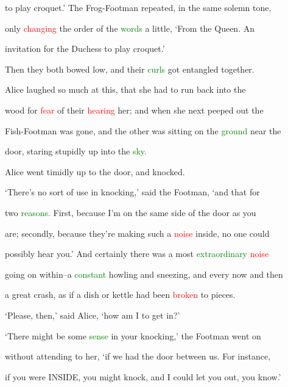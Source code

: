  to play croquet.’ The Frog-Footman repeated, in the same solemn tone,

 only \textcolor{red}{changing} the order of the \textcolor{green}{words} a little, ‘From the Queen. An

 \textcolor{BurntOrange}{invitation} for the Duchess to play croquet.’



 Then they both bowed low, and their \textcolor{green}{curls} got entangled together.



 Alice \textcolor{BurntOrange}{laughed} so much at this, that she had to run back into the

 wood for \textcolor{red}{fear} of their \textcolor{red}{hearing} her; and when she next peeped out the

 Fish-Footman was gone, and the other was sitting on the \textcolor{green}{ground} near the

 door, \textcolor{BurntOrange}{staring} stupidly up into the \textcolor{green}{sky.}



 Alice went timidly up to the door, and knocked.



 ‘There’s no sort of use in knocking,’ said the Footman, ‘and that for

 two \textcolor{green}{reasons.} First, because I’m on the same side of the door as you

 are; secondly, because they’re making such a \textcolor{red}{noise} inside, no one could

 possibly hear you.’ And certainly there was a most \textcolor{green}{extraordinary} \textcolor{red}{noise}

 going on within--a \textcolor{green}{constant} \textcolor{BurntOrange}{howling} and \textcolor{BurntOrange}{sneezing,} and every now and then

 a great \textcolor{BurntOrange}{crash,} as if a dish or kettle had been \textcolor{red}{broken} to pieces.



 ‘Please, then,’ said Alice, ‘how am I to get in?’



 ‘There might be some \textcolor{green}{sense} in your knocking,’ the Footman went on

 without attending to her, ‘if we had the door between us. For instance,

 if you were INSIDE, you might knock, and I could let you out, you know.’

